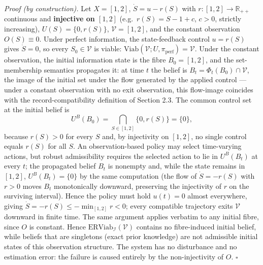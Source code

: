 \documentclass[11pt]{article}
\begin{document}
\emph{Proof (by construction).} Let \(X = [1,2]\), \(\dot S = u - r(S)\)
with \(r : [1,2] \to \mathbb{R}_{++}\) continuous and \textbf{injective
on \([1,2]\)} (e.g.~\(r(S) = S - 1 + c\), \(c > 0\), strictly
increasing), \(U(S) = \{0, r(S)\}\), \(\mathcal{V} = [1,2]\), and the
constant observation \(O(S) \equiv 0\). Under perfect information, the
state-feedback control \(u = r(S)\) gives \(\dot S = 0\), so every
\(S_0 \in \mathcal{V}\) is viable:
\(\mathrm{Viab}(\mathcal{V}; U, \pi_{\mathrm{perf}}) = \mathcal{V}\).
Under the constant observation, the initial information state is the
fibre \(B_0 = [1,2]\), and the set-membership semantics propagates it:
at time \(t\) the belief is \(B_t = \Phi_t(B_0) \cap \mathcal{V}\), the
image of the initial set under the flow generated by the applied control
--- under a constant observation with no exit observation, this
flow-image coincides with the record-compatibility definition of Section
2.3. The common control set at the initial belief is
\[U^B(B_0) = \bigcap_{S \in [1,2]} \{0, r(S)\} = \{0\},\] because
\(r(S) > 0\) for every \(S\) and, by injectivity on \([1,2]\), no single
control equals \(r(S)\) for all \(S\). An observation-based policy may
select time-varying actions, but robust admissibility requires the
selected action to lie in \(U^B(B_t)\) at every \(t\); the propagated
belief \(B_t\) is nonempty and, while the state remains in \([1,2]\),
\(U^B(B_t) = \{0\}\) by the same computation (the flow of
\(\dot S = -r(S)\) with \(r > 0\) moves \(B_t\) monotonically downward,
preserving the injectivity of \(r\) on the surviving interval). Hence
the policy must hold \(u(t) = 0\) almost everywhere, giving
\(\dot S = -r(S) \le -\min_{[1,2]} r < 0\); every compatible trajectory
exits \(\mathcal{V}\) downward in finite time. The same argument applies
verbatim to any initial fibre, since \(O\) is constant. Hence
\(\mathrm{ERViab}_{\mathcal{I}}(\mathcal{V})\) contains no fibre-induced
initial belief, while beliefs that are singletons (exact prior
knowledge) are not admissible initial states of this observation
structure. The system has no disturbance and no estimation error: the
failure is caused entirely by the non-injectivity of \(O\). \ensuremath{\square}
\end{document}
